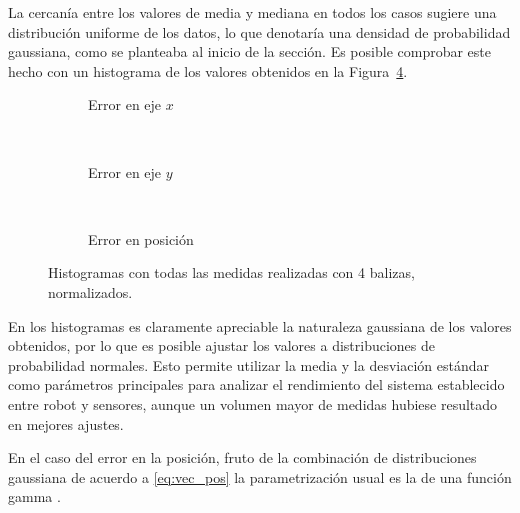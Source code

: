 La cercanía entre los valores de media y mediana en todos los casos sugiere una distribución uniforme de los datos, lo que denotaría una densidad de probabilidad gaussiana, como se planteaba al inicio de la sección.
Es posible comprobar este hecho con un histograma de los valores obtenidos en la Figura~\ref{fig:histogramas_lab_4sens}.
\begin{figure}[H]
    \hspace*{-0.5cm}
    \begin{subfigure}[b]{.3\textwidth}
      \centering
       
      \vspace*{-0.5cm}
      \caption{Error en eje $x$}
      \label{fig:histogramas_lab_4sens_x}
    \end{subfigure}
    ~~~~~~~~~
    \begin{subfigure}[b]{.3\textwidth}
      \centering
      
      \vspace*{-0.5cm}
      \caption{Error en eje $y$}
      \label{fig:histogramas_lab_4sens_y}
    \end{subfigure}
    ~~~~~
    \begin{subfigure}[b]{.3\textwidth}
        \centering
        
        \vspace*{-0.5cm}
        \caption{Error en posición}
        \label{fig:histogramas_lab_4sens_pos}
      \end{subfigure}
    \caption{Histogramas con todas las medidas realizadas con 4 balizas, normalizados.}
    \label{fig:histogramas_lab_4sens}
  \end{figure}


En los histogramas es claramente apreciable la naturaleza gaussiana de los valores obtenidos, por lo que es posible ajustar los valores a distribuciones de probabilidad normales.
Esto permite utilizar la media y la desviación estándar como parámetros principales para analizar el rendimiento del sistema establecido entre robot y sensores, aunque un volumen mayor de medidas hubiese resultado en mejores ajustes.

En el caso del error en la posición, fruto de la combinación de distribuciones gaussiana de acuerdo a \eqref{eq:vec_pos} la parametrización usual es la de una función gamma \cite{jimenez}.


